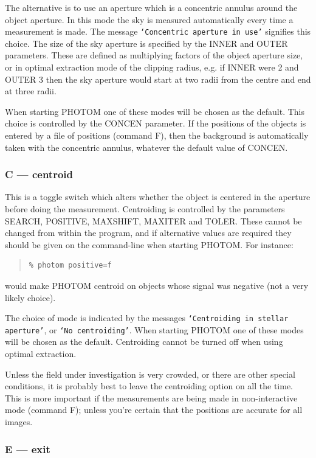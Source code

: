 \documentclass[twoside,11pt]{article}
\renewcommand{\_}{\texttt{\symbol{95}}}
\newcommand{\st}[1]{\texttt{`#1'}}
\begin{document}
The alternative is to use an aperture which is a concentric annulus
around the object aperture. In this mode the sky is measured
automatically every time a measurement is made. The message
\st{Concentric aperture in use} signifies this choice. The size of the
sky aperture is specified by the INNER and OUTER parameters. These are
defined as multiplying factors of the object aperture size, or in optimal
extraction mode of the clipping radius, e.g. if INNER were 2 and OUTER 3 
then the sky aperture would start at two radii from the centre and end at 
three radii.

When starting PHOTOM one of these modes will be chosen as the default.
This choice is controlled by the CONCEN parameter.
If the positions of the objects is entered by a file of positions
(command F), then the background is automatically taken with the
concentric annulus, whatever the default value of CONCEN.

\subsubsection{C --- centroid}

This is a toggle switch which alters whether the object is centered in
the aperture before doing the measurement. Centroiding is
controlled by the parameters SEARCH, POSITIVE, MAXSHIFT, MAXITER and
TOLER. These cannot be changed from within the program, and if
alternative values are required they should be given on the
command-line when starting PHOTOM. For instance:
\begin{quote}
\begin{verbatim}
% photom positive=f
\end{verbatim}
\end{quote}
would make PHOTOM centroid on objects whose signal was negative (not a
very likely choice).

The choice of mode is indicated by the messages \st{Centroiding in stellar
aperture}, or \st{No centroiding}. When starting PHOTOM one of these modes
will be chosen as the default. Centroiding cannot be turned off when using optimal extraction.

Unless the field under investigation is very crowded, or there are other
special conditions, it is probably best to leave the centroiding option
on all the time. This is more important if the measurements are being
made in non-interactive mode (command F); unless you're certain
that the positions are accurate for all images.

\subsubsection{E --- exit}
\end{document}
